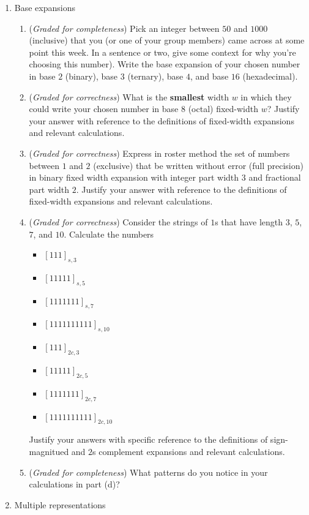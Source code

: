 \documentclass[12pt, oneside]{article}
\newcommand{\gradeCorrect}{({\it Graded for correctness}) }
\newcommand{\gradeComplete}{({\it Graded for completeness}) }
\begin{document}
\begin{enumerate}[labelindent=0pt, leftmargin=0pt]
\item Base expansions
    \begin{enumerate}
        \item\gradeComplete Pick an integer between $50$ and $1000$ (inclusive) that you (or one of your
        group members) came across at some point this week. 
        In a sentence or two, give some context for why you're choosing this number). 
        Write the base expansion of your chosen number in base $2$ (binary), base $3$ (ternary), base $4$, and base $16$ (hexadecimal).
        \item\gradeCorrect What is the {\bf smallest} width $w$ in which they could write your chosen number in base $8$ (octal) 
        fixed-width $w$? Justify your answer with reference to the definitions of fixed-width expansions and relevant calculations.
        \item\gradeCorrect Express in roster method the set of numbers between $1$ and $2$ (exclusive) that be written without error 
        (full precision)
        in binary fixed width expansion with integer part width $3$ and fractional part width $2$. Justify your answer with 
        reference to the definitions of fixed-width expansions and relevant calculations.
        \item\gradeCorrect Consider the strings of $1$s that have length $3$, $5$, $7$, and $10$.
        Calculate the numbers 
        \begin{itemize}
            \item[] $[111]_{s,3}$
            \item[] $[11111]_{s,5}$
            \item[] $[1111111]_{s,7}$
            \item[] $[1111111111]_{s,10}$
            \item[] $[111]_{2c,3}$
            \item[] $[11111]_{2c,5}$
            \item[] $[1111111]_{2c,7}$
            \item[] $[1111111111]_{2c,10}$
        \end{itemize}
        Justify your answers with specific reference to the definitions of sign-magnitued and $2$s complement expansions and relevant calculations.
        \item \gradeComplete What patterns do you notice in your calculations in part (d)?
    \end{enumerate}

\item Multiple representations


\end{enumerate}
\end{document}
